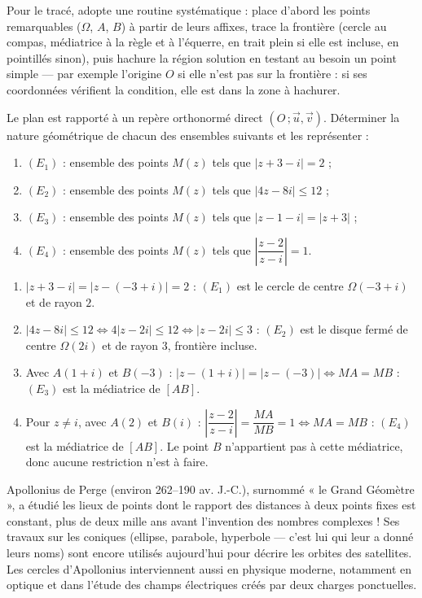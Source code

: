 \documentclass[11pt]{article}
\begin{document}
Pour le tracé, adopte une routine systématique : place d'abord les points remarquables ($\Omega$, $A$, $B$) à partir de leurs affixes, trace la frontière (cercle au compas, médiatrice à la règle et à l'équerre, en trait plein si elle est incluse, en pointillés sinon), puis hachure la région solution en testant au besoin un point simple — par exemple l'origine $O$ si elle n'est pas sur la frontière : si ses coordonnées vérifient la condition, elle est dans la zone à hachurer.

\begin{exercice}
Le plan est rapporté à un repère orthonormé direct $(O\,;\vec{u},\vec{v})$. Déterminer la nature géométrique de chacun des ensembles suivants et les représenter :
\begin{enumerate}
\item $(E_1)$ : ensemble des points $M(z)$ tels que $|z + 3 - i| = 2$ ;
\item $(E_2)$ : ensemble des points $M(z)$ tels que $|4z - 8i| \leq 12$ ;
\item $(E_3)$ : ensemble des points $M(z)$ tels que $|z - 1 - i| = |z + 3|$ ;
\item $(E_4)$ : ensemble des points $M(z)$ tels que $\left|\dfrac{z - 2}{z - i}\right| = 1$.
\end{enumerate}
\end{exercice}

\begin{corrige}[Exercice]
\begin{enumerate}
\item $|z + 3 - i| = |z - (-3 + i)| = 2$ : $(E_1)$ est le cercle de centre $\Omega(-3 + i)$ et de rayon $2$.
\item $|4z - 8i| \leq 12 \iff 4|z - 2i| \leq 12 \iff |z - 2i| \leq 3$ : $(E_2)$ est le disque fermé de centre $\Omega(2i)$ et de rayon $3$, frontière incluse.
\item Avec $A(1 + i)$ et $B(-3)$ : $|z - (1+i)| = |z - (-3)| \iff MA = MB$ : $(E_3)$ est la médiatrice de $[AB]$.
\item Pour $z \neq i$, avec $A(2)$ et $B(i)$ : $\left|\dfrac{z-2}{z-i}\right| = \dfrac{MA}{MB} = 1 \iff MA = MB$ : $(E_4)$ est la médiatrice de $[AB]$. Le point $B$ n'appartient pas à cette médiatrice, donc aucune restriction n'est à faire.
\end{enumerate}
\end{corrige}

\begin{savaistu}
Apollonius de Perge (environ 262--190 av. J.-C.), surnommé « le Grand Géomètre », a étudié les lieux de points dont le rapport des distances à deux points fixes est constant, plus de deux mille ans avant l'invention des nombres complexes ! Ses travaux sur les coniques (ellipse, parabole, hyperbole — c'est lui qui leur a donné leurs noms) sont encore utilisés aujourd'hui pour décrire les orbites des satellites. Les cercles d'Apollonius interviennent aussi en physique moderne, notamment en optique et dans l'étude des champs électriques créés par deux charges ponctuelles.
\end{savaistu}
\end{document}
